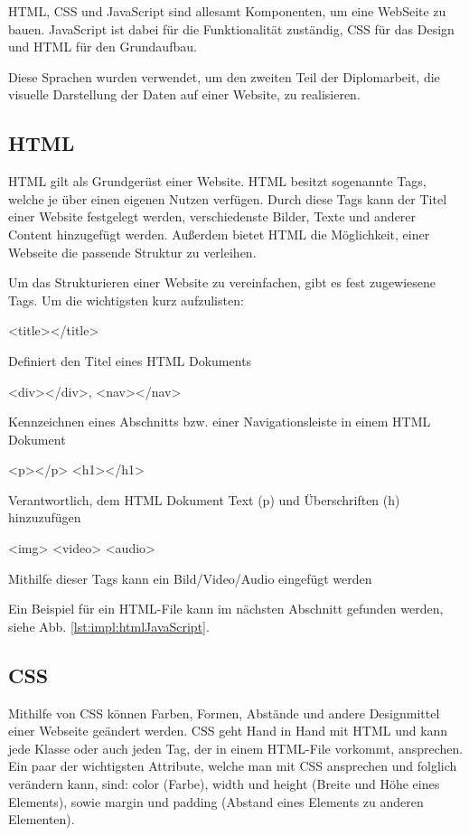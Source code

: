 HTML, CSS und JavaScript sind allesamt Komponenten, um eine WebSeite zu bauen. JavaScript ist dabei für die Funktionalität zuständig, CSS für das Design und HTML für den Grundaufbau.

Diese Sprachen wurden verwendet, um den zweiten Teil der Diplomarbeit, die visuelle Darstellung der Daten auf einer Website, zu realisieren.

\subsection{HTML}
HTML gilt als Grundgerüst einer Website. HTML besitzt sogenannte Tags, welche je über einen eigenen Nutzen verfügen. Durch diese Tags kann der Titel einer Website festgelegt werden, verschiedenste Bilder, Texte und anderer Content hinzugefügt werden. Außerdem bietet HTML die Möglichkeit, einer Webseite die passende Struktur zu verleihen. \cite{durchstartenHTML}

Um das Strukturieren einer Website zu vereinfachen, gibt es fest zugewiesene Tags. Um die wichtigsten kurz aufzulisten:
 
\begin{compactitem}
    \item [<title></title>]
    \item Definiert den Titel eines HTML Dokuments
    \item [<div></div>, <nav></nav>]
    \item Kennzeichnen eines Abschnitts bzw. einer Navigationsleiste in einem HTML Dokument
    \item [<p></p> <h1></h1>]
    \item Verantwortlich, dem HTML Dokument Text (p) und Überschriften (h) hinzuzufügen
    \item [<img> <video> <audio>]
    \item Mithilfe dieser Tags kann ein Bild/Video/Audio eingefügt werden
\end{compactitem}\cite{durchstartenHTML}

Ein Beispiel für ein HTML-File kann im nächsten Abschnitt gefunden werden, siehe Abb. \ref{lst:impl:htmlJavaScript}.
 
\subsection{CSS}
Mithilfe von CSS können Farben, Formen, Abstände und andere Designmittel einer Webseite geändert werden. CSS geht Hand in Hand mit HTML und kann jede Klasse oder auch jeden Tag, der in einem HTML-File vorkommt, ansprechen. Ein paar der wichtigsten Attribute, welche man mit CSS ansprechen und folglich verändern kann, sind: color (Farbe), width und height (Breite und Höhe eines Elements), sowie margin und padding (Abstand eines Elements zu anderen Elementen).
 
